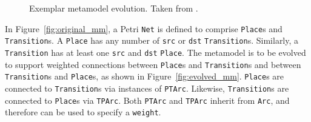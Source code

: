 \begin{figure}[bp]
	\centering
	\caption[Exemplar metamodel evolution (Petri nets)]{Exemplar metamodel evolution. Taken from \cite{rose10flock}.}
\label{fig:petri_nets_mms}
\end{figure}

In Figure~\ref{fig:original_mm}, a Petri \texttt{Net} is defined to comprise \texttt{Place}s and \texttt{Transition}s. A \texttt{Place} has any number of \texttt{src} or \texttt{dst} \texttt{Transition}s. Similarly, a \texttt{Transition} has at least one \texttt{src} and \texttt{dst} \texttt{Place}. The metamodel is to be evolved to support weighted connections between \texttt{Place}s and \texttt{Transition}s and between \texttt{Transition}s and \texttt{Place}s, as shown in Figure~\ref{fig:evolved_mm}. \texttt{Place}s are connected to \texttt{Transition}s via instances of \texttt{PTArc}. Likewise, \texttt{Transition}s are connected to \texttt{Place}s via \texttt{TPArc}. Both \texttt{PTArc} and \texttt{TPArc} inherit from \texttt{Arc}, and therefore can be used to specify a \texttt{weight}.

